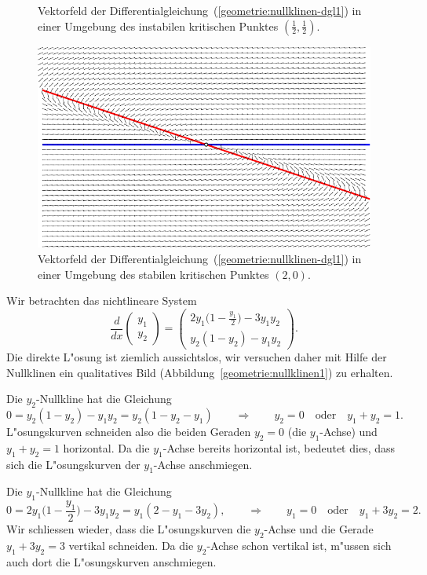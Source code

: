 \begin{beispiel}
\begin{figure}
\caption{Vektorfeld der Differentialgleichung~(\ref{geometrie:nullklinen-dgl1})
in einer Umgebung des instabilen kritischen Punktes $(\frac12,\frac12)$.
\label{geometrie:nullklinen-instabil}}
\end{figure}
\begin{figure}
\centering
\includegraphics{chapters/images/nullklinen-4.pdf}
\caption{Vektorfeld der Differentialgleichung~(\ref{geometrie:nullklinen-dgl1})
in einer Umgebung des stabilen kritischen Punktes $(2,0)$.
\label{geometrie:nullklinen-stabil}}
\end{figure}
Wir betrachten das nichtlineare System 
\begin{equation}
\frac{d}{dx} \begin{pmatrix}y_1\\y_2\end{pmatrix}
=
\begin{pmatrix}
2y_1\biggl(1-\displaystyle\frac{y_1}2\biggr)-3y_1y_2\\
y_2(1-y_2)-y_1y_2
\end{pmatrix}.
\label{geometrie:nullklinen-dgl1}
\end{equation}
Die direkte L"osung ist ziemlich aussichtslos, wir versuchen daher mit
Hilfe der Nullklinen ein qualitatives Bild
(Abbildung~\ref{geometrie:nullklinen1}) zu erhalten.

Die $y_2$-Nullkline hat die Gleichung
\[
0=y_2(1-y_2)-y_1y_2=y_2(1-y_2-y_1)
\qquad\Rightarrow\qquad
y_2=0
\quad\text{oder}\quad
y_1+y_2=1.
\]
L"osungskurven schneiden also die beiden Geraden $y_2=0$ (die $y_1$-Achse)
und $y_1+y_2=1$ horizontal.
Da die $y_1$-Achse bereits horizontal ist, bedeutet dies, dass sich die
L"osungskurven der $y_1$-Achse anschmiegen.

Die $y_1$-Nullkline hat die Gleichung
\[
0=2y_1\biggl(1-\frac{y_1}2\biggr)-3y_1y_2=y_1(2-y_1-3y_2),
\qquad\Rightarrow\qquad
y_1=0
\quad\text{oder}\quad
y_1+3y_2=2.
\]
Wir schliessen wieder, dass die L"osungskurven die $y_2$-Achse und
die Gerade $y_1+3y_2=3$ vertikal schneiden.
Da die $y_2$-Achse schon vertikal ist, m"ussen sich auch dort
die L"osungskurven anschmiegen.


\end{beispiel}
